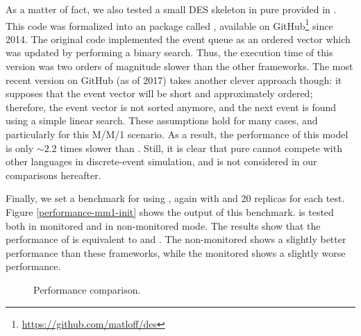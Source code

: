 \documentclass[
  nojss]{jss}
\begin{document}
As a matter of fact, we also tested a small DES skeleton in pure
 provided in
\citep[7.8.3 Extended Example: Discrete-Event Simulation in ]{Matloff:2011:ARP:2090080}.
This code was formalized into an  package called ,
available on GitHub\footnote{\url{https://github.com/matloff/des}} since
2014. The original code implemented the event queue as an ordered vector
which was updated by performing a binary search. Thus, the execution
time of this version was two orders of magnitude slower than the other
frameworks. The most recent version on GitHub (as of 2017) takes another
clever approach though: it supposes that the event vector will be short
and approximately ordered; therefore, the event vector is not sorted
anymore, and the next event is found using a simple linear search. These
assumptions hold for many cases, and particularly for this M/M/1
scenario. As a result, the performance of this model is only \(\sim2.2\)
times slower than . Still, it is clear that pure 
cannot compete with other languages in discrete-event simulation, and
 is not considered in our comparisons hereafter.

Finally, we set a benchmark for  using ,
again with  and 20 replicas for each test. Figure
\ref{performance-mm1-init} shows the output of this benchmark.
 is tested both in monitored and in non-monitored mode. The
results show that the performance of  is equivalent to
 and . The non-monitored  shows a
slightly better performance than these frameworks, while the monitored
 shows a slightly worse performance.

\begin{CodeChunk}
\begin{figure}

{\centering {}

}

\caption[Performance comparison]{Performance comparison.}\label{fig:performance-mm1-plot}
\end{figure}
\end{CodeChunk}
\end{document}
